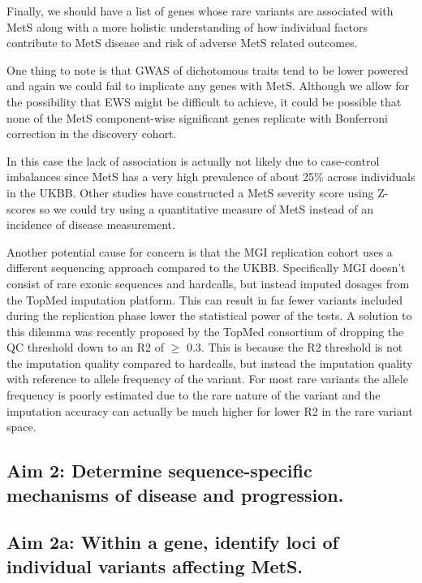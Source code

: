 \documentclass[11pt]{article}
\begin{document}
Finally, we should have a list of genes whose rare variants are associated with MetS along with a more holistic understanding of how individual factors contribute to MetS disease and risk of adverse MetS related outcomes.

\noindent {}

One thing to note is that GWAS of dichotomous traits tend to be lower powered and again we could fail to implicate any genes with MetS. Although we allow for the possibility that EWS might be difficult to achieve, it could be possible that none of the MetS component-wise significant genes replicate with Bonferroni correction in the discovery cohort.

In this case the lack of association is actually not likely due to case-control imbalances since MetS has a very high prevalence of about 25\% across individuals in the UKBB. Other studies have constructed a MetS severity score using Z-scores so we could try using a quantitative measure of MetS instead of an incidence of disease measurement. 

Another potential cause for concern is that the MGI replication cohort uses a different sequencing approach compared to the UKBB. Specifically MGI doesn't consist of rare exonic sequences and hardcalls, but instead imputed dosages from the TopMed imputation platform. This can result in far fewer variants included during the replication phase lower the statistical power of the tests. A solution to this dilemma was recently proposed by the TopMed consortium of dropping the QC threshold down to an R2 of $\ge$ 0.3. This is because the R2 threshold is not the imputation quality compared to hardcalls, but instead the imputation quality with reference to allele frequency of the variant. For most rare variants the allele frequency is poorly estimated due to the rare nature of the variant and the imputation accuracy can actually be much higher for lower R2 in the rare variant space.

\subsection*{Aim 2: Determine sequence-specific mechanisms of disease and progression.}

\subsection*{Aim 2a: Within a gene, identify loci of individual variants affecting MetS.} 
\end{document}
